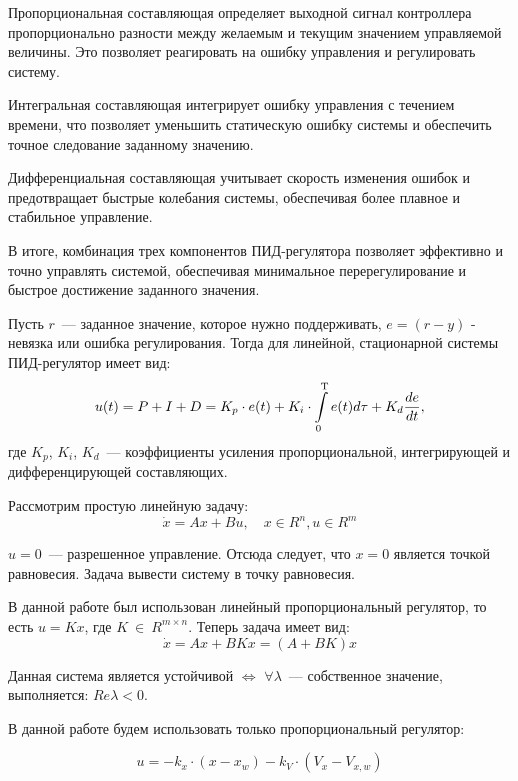 \documentclass[a4paper,12pt]{article}
\begin{document}
Пропорциональная составляющая определяет выходной сигнал контроллера пропорционально разности между желаемым и текущим значением управляемой величины. Это позволяет реагировать на ошибку управления и регулировать систему.

Интегральная составляющая интегрирует ошибку управления с течением времени, что позволяет уменьшить статическую ошибку системы и обеспечить точное следование заданному значению.

Дифференциальная составляющая учитывает скорость изменения ошибок и предотвращает быстрые колебания системы, обеспечивая более плавное и стабильное управление.

В итоге, комбинация трех компонентов ПИД-регулятора позволяет эффективно и точно управлять системой, обеспечивая минимальное перерегулирование и быстрое достижение заданного значения.

Пусть $r$~--- заданное значение, которое нужно поддерживать, $e = (r-y)$ - невязка или ошибка регулирования. Тогда для линейной, стационарной системы ПИД-регулятор имеет вид:
\begin{equation}
    u(t) = P + I + D = K_p\cdot e(t) + K_i \cdot \int\limits_0^\text{\textup{T}} e(t) d\tau + K_d \frac{de}{dt},
\end{equation} 
где $K_p$, $K_i$, $K_d$~--- коэффициенты усиления пропорциональной, интегрирующей и дифференцирующей составляющих.

Рассмотрим простую линейную задачу:
\begin{equation}\label{PID}
    \Dot{x} = Ax + Bu,\quad x \in R^n, u \in R^m
\end{equation}

$u = 0 $~--- разрешенное управление. Отсюда следует, что $x = 0$ является точкой равновесия. Задача вывести систему в точку равновесия.

В данной работе был использован линейный пропорциональный регулятор, то есть $u = Kx$, где $K~\in~R^{m\times n}$.
Теперь задача имеет вид:
\begin{equation}\label{PID_lin}
    \Dot{x} = Ax + BKx = (A+BK)x
\end{equation}

Данная система является устойчивой $\Longleftrightarrow$ $\forall \lambda$~--- собственное значение, выполняется: $Re\lambda < 0$.

В данной работе будем использовать только пропорциональный регулятор:

$$u = -k_x \cdot (x - x_w) - k_V\cdot (V_x - V_{x,w})$$
\end{document}
